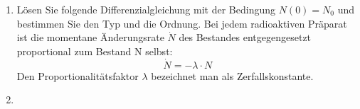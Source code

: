 \documentclass[fleqn]{article}
\begin{document}
\begin{enumerate}
  \item L\"osen Sie folgende Differenzialgleichung mit der Bedingung $N(0)=N_0$ und bestimmen Sie den Typ und die Ordnung. Bei jedem radioaktiven Pr\"aparat ist die momentane \"Anderungsrate $\dot{N}$ des Bestandes entgegengesetzt proportional zum Bestand N selbst:
    \begin{equation}
      \dot{N}=-\lambda\cdot N
    \end{equation}
  Den Proportionalit\"atsfaktor $\lambda$ bezeichnet man als Zerfallskonstante.
    \item 
\end{enumerate}
\end{document}
